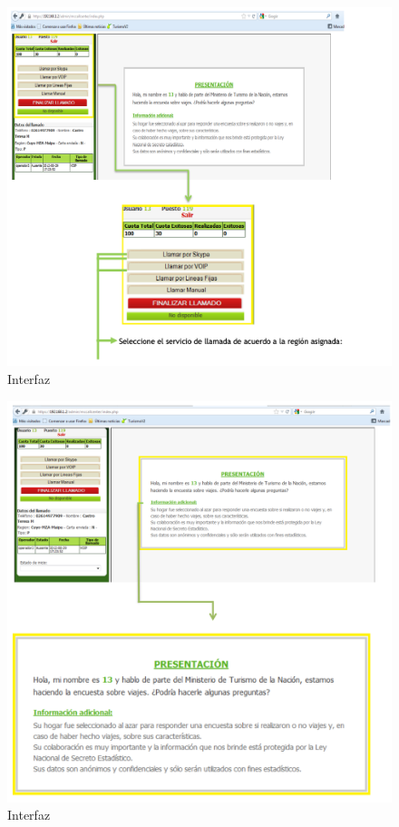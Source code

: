 \documentclass[
  openany]{book}
\begin{document}
\begin{figure}

{\centering \includegraphics[width=1\linewidth]{imagenes/figura6-25} 

}

\caption{Interfaz}\label{fig:i}
\end{figure}

\begin{figure}

{\centering \includegraphics[width=1\linewidth]{imagenes/figura6-26} 

}

\caption{Interfaz}\label{fig:interfaz3}
\end{figure}
\end{document}

